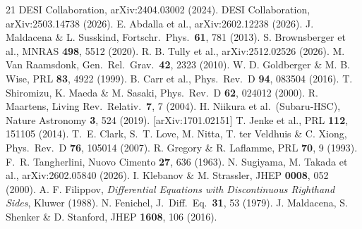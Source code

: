 \documentclass[11pt]{article}
\begin{document}
{\small
\begin{thebibliography}{21}
 DESI Collaboration, arXiv:2404.03002 (2024).
 DESI Collaboration, arXiv:2503.14738 (2026).
 E. Abdalla et al., arXiv:2602.12238 (2026).
 J. Maldacena \& L. Susskind, Fortschr.\ Phys.\ \textbf{61}, 781 (2013).
 S. Brownsberger et al., MNRAS \textbf{498}, 5512 (2020).
 R. B. Tully et al., arXiv:2512.02526 (2026).
 M. Van Raamsdonk, Gen.\ Rel.\ Grav.\ \textbf{42}, 2323 (2010).
 W. D. Goldberger \& M. B. Wise, PRL \textbf{83}, 4922 (1999).
 B. Carr et al., Phys.\ Rev.\ D \textbf{94}, 083504 (2016).
 T. Shiromizu, K. Maeda \& M. Sasaki, Phys.\ Rev.\ D \textbf{62}, 024012 (2000).
 R. Maartens, Living Rev.\ Relativ.\ \textbf{7}, 7 (2004).
 H. Niikura et al.\ (Subaru-HSC), Nature Astronomy \textbf{3}, 524 (2019). [arXiv:1701.02151]
 T. Jenke et al., PRL \textbf{112}, 151105 (2014).
 T.~E. Clark, S.~T. Love, M. Nitta, T. ter Veldhuis \& C. Xiong, Phys.\ Rev.\ D \textbf{76}, 105014 (2007).
 R. Gregory \& R. Laflamme, PRL \textbf{70}, 9 (1993).
 F.~R. Tangherlini, Nuovo Cimento \textbf{27}, 636 (1963).
 N. Sugiyama, M. Takada et al., arXiv:2602.05840 (2026).
 I. Klebanov \& M. Strassler, JHEP \textbf{0008}, 052 (2000).
 A. F. Filippov, \textit{Differential Equations with Discontinuous Righthand Sides}, Kluwer (1988).
 N. Fenichel, J.\ Diff.\ Eq.\ \textbf{31}, 53 (1979).
 J. Maldacena, S. Shenker \& D. Stanford, JHEP \textbf{1608}, 106 (2016).
\end{thebibliography}
}
\end{document}
